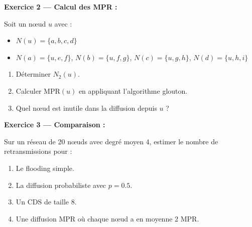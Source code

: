 \documentclass[12pt,a4paper]{article}
\begin{document}
\begin{exemple}
\textbf{Exercice 2 --- Calcul des MPR :}

Soit un nœud $u$ avec :
\begin{itemize}
    \item $N(u) = \{a, b, c, d\}$
    \item $N(a) = \{u, e, f\}$, $N(b) = \{u, f, g\}$, $N(c) = \{u, g, h\}$, $N(d) = \{u, h, i\}$
\end{itemize}

\begin{enumerate}
    \item Déterminer $N_2(u)$.
    \item Calculer $\text{MPR}(u)$ en appliquant l'algorithme glouton.
    \item Quel nœud est inutile dans la diffusion depuis $u$ ?
\end{enumerate}
\end{exemple}

\begin{exemple}
\textbf{Exercice 3 --- Comparaison :}

Sur un réseau de 20 nœuds avec degré moyen 4, estimer le nombre de retransmissions pour :
\begin{enumerate}
    \item Le flooding simple.
    \item La diffusion probabiliste avec $p = 0.5$.
    \item Un CDS de taille 8.
    \item Une diffusion MPR où chaque nœud a en moyenne 2 MPR.
\end{enumerate}
\end{exemple}
\end{document}
